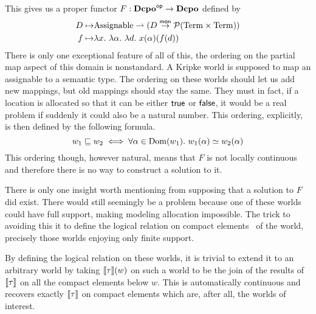 This gives us a proper functor $F : \mathbf{Dcpo}^{\mathsf{op}} \to \mathbf{Dcpo}$ defined by
\begin{align*}
  D \mapsto& \assignables \pto (D \mto \pow{\term \times \term})\\
  f \mapsto& \lambda x.\ \lambda \alpha.\ \lambda d.\ x(\alpha)(f(d))
\end{align*}
There is only one exceptional feature of all of this, the ordering on
the partial map aspect of this domain is nonstandard. A Kripke world
is supposed to map an assignable to a semantic type. The ordering on
these worlds should let us add new mappings, but old mappings should
stay the same. They must in fact, if a location is allocated so that
it can be either $\mathsf{true}$ or $\mathsf{false}$, it would be a real
problem if suddenly it could also be a natural number. This ordering,
explicitly, is then defined by the following formula.
\[
  w_1 \mathrel{\sqsubseteq} w_2 \iff \forall \alpha \in \operatorname{Dom}(w_1).\ w_1(\alpha) \simeq w_2(\alpha)
\]
This ordering though, however natural, means that $F$ is not locally
continuous and therefore there is no way to construct a solution to
it.

There is only one insight worth mentioning from supposing that a
solution to $F$ did exist. There would still seemingly be a problem
because one of these worlds could have full support, making modeling
allocation impossible. The trick to avoiding this it to define the
logical relation on compact elements~\citep{Girez:03} of the
world, precisely those worlds enjoying only finite support.

By defining the logical relation on these worlds, it is trivial to
extend it to an arbitrary world by taking $\llbracket \tau \rrbracket(w)$ on such a
world to be the join of the results of $\llbracket \tau \rrbracket$ on all the compact
elements below $w$. This is automatically continuous and recovers
exactly $\llbracket \tau \rrbracket$ on compact elements which are, after all, the
worlds of interest.

